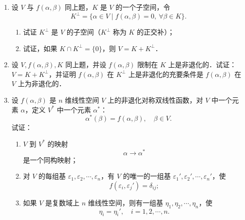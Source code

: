 \begin{enumerate}
  \ansproof
  \item 设 $V$ 与 $f(\alpha,\beta)$ 同上题，$K$ 是 $V$ 的一个子空间，令
  \[
    K^{\perp}=\{\alpha\in V\mid f(\alpha,\beta)=0,\ \forall\beta\in K\}.
  \]
  \begin{enumerate}
    \item 试证 $K^{\perp}$ 是 $V$ 的子空间（$K^{\perp}$ 称为 $K$ 的正交补）；
  \anssub
    \item 试证，如果 $K\cap K^{\perp}=\{0\}$，则 $V=K+K^{\perp}$．
  \anssub
  \end{enumerate}

  \item 设 $V,f(\alpha,\beta),K$ 同上题，并设 $f(\alpha,\beta)$ 限制在 $K$ 上是非退化的．试证：$V=K+K^{\perp}$，并证明 $f(\alpha,\beta)$ 在 $K^{\perp}$ 上是非退化的充要条件是 $f(\alpha,\beta)$ 在 $V$ 上为非退化的．

  \ansproof
  \item 设 $f(\alpha,\beta)$ 是 $n$ 维线性空间 $V$ 上的非退化对称双线性函数，对 $V$ 中一个元素 $\alpha$，定义 $V^*$ 中一个元素 $\alpha^*$：
  \[
    \alpha^*(\beta)=f(\alpha,\beta),\quad \beta\in V.
  \]
  试证：
  \begin{enumerate}
    \item $V$ 到 $V^*$ 的映射
    \[
      \alpha\to\alpha^*
    \]
    是一个同构映射；
  \anssub
    \item 对 $V$ 的每组基 $\varepsilon_1,\varepsilon_2,\cdots,\varepsilon_n$，有 $V$ 的唯一的一组基 $\varepsilon_1',\varepsilon_2',\cdots,\varepsilon_n'$，使
    \[
      f(\varepsilon_i,\varepsilon_j')=\delta_{ij};
    \]
  \anssub
    \item 如果 $V$ 是复数域上 $n$ 维线性空间，则有一组基 $\eta_1,\eta_2,\cdots,\eta_n$，使
    \[
      \eta_i=\eta_i',\quad i=1,2,\cdots,n.
    \]
  \anssub
  \end{enumerate}


\end{enumerate}
